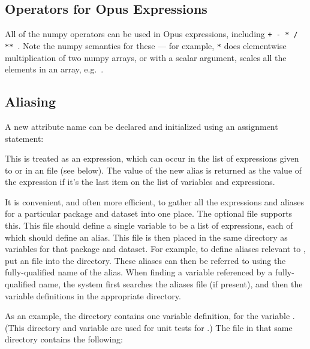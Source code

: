 
\subsection{Operators for Opus Expressions}

All of the numpy operators can be used in Opus expressions, including
\verb|+ - * / ** |.  Note the numpy semantics for these --- for example,
\verb|*| does elementwise multiplication of two numpy arrays, or with a
scalar argument, scales all the elements in an array,
e.g.\ .

\subsection{Aliasing}
\label{sec:aliasing}

A new attribute name can be declared and initialized using an assignment
statement:


This is treated as an expression, which can occur in the list of
expressions given to  or in an 
file (see below).  The value of the new alias is returned as the value of
the expression if it's the last item on the list of variables and
expressions.

It is convenient, and often more efficient, to gather all the expressions
and aliases for a particular package and dataset into one place.  The
optional  file supports this.  
This file should define a
single variable  to be a list of expressions, each of which
should define an alias.  This file is then placed in the same directory as
variables for that package and dataset.  For example, to define aliases
relevant to , put an  file into
the  directory.  These aliases can then be referred
to using the fully-qualified name of the alias.  When finding a variable
referenced by a fully-qualified name, the system first searches the aliases
file (if present), and then the variable definitions in the appropriate
directory.

As an example, the directory  contains one
variable definition, for the variable .  (This
directory and variable are used for unit tests for .)
The file  in that same directory contains the following:

